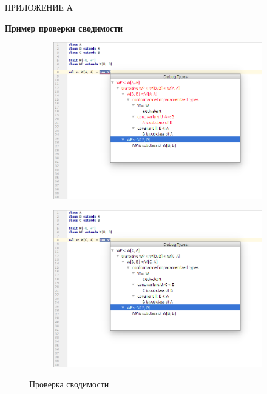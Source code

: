\vfill
\clearpage
\appendix

\hfill ПРИЛОЖЕНИЕ А
\begin{center}
  \textbf{Пример проверки сводимости}
\end{center}
\markboth{\MakeUppercase{}}{}

\begin{figure}[h!]
  \centering
  \begin{subfigure}{\linewidth}
    \centering
    \includegraphics[width=.8\linewidth]{img/conformance1}
  \end{subfigure}

  \begin{subfigure}{\linewidth}
    \centering
    \includegraphics[width=.8\linewidth]{img/conformance2}
  \end{subfigure}
  \caption{Проверка сводимости}
  \label{fig:conformance}
\end{figure}


